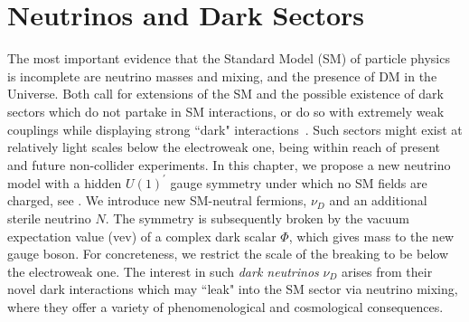 \graphicspath{{}{dark_nus/}{Diagrams/}}

\section{Neutrinos and Dark Sectors}

The most important evidence that the Standard Model (SM) of particle physics is incomplete are neutrino masses and mixing, and the presence of DM in the Universe. Both call for extensions of the SM and the possible existence of dark sectors which do not partake in SM interactions, or do so with extremely weak couplings while displaying strong ``dark" interactions~\cite{Boehm:2003hm,Boehm:2003ha,Alexander:2016aln}. Such sectors might exist at relatively light scales below the electroweak one, being within reach of present and future non-collider experiments. In this chapter, we propose a new neutrino model with a hidden $U(1)^\prime$ gauge symmetry under which no SM fields are charged, see  . We introduce new SM-neutral fermions, $\nu_D$ and an additional sterile neutrino $N$. The symmetry is subsequently broken by the vacuum expectation value (vev) of a complex dark scalar $\Phi$, which gives mass to the new gauge boson. For concreteness, we restrict the scale of the breaking to be below the electroweak one. The interest in such \textit{dark neutrinos} $\nu_D$ arises from their novel dark interactions which may ``leak" into the SM sector via neutrino mixing, where they offer a variety of phenomenological and cosmological consequences. 

